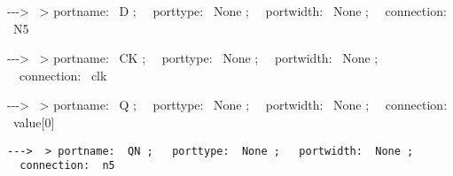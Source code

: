 \documentclass[a4paper]{article}
\begin{document}
\begin{center}
\begin{minipage}{6.07292in}
{\ttfamily\color[rgb]{0.0,0.0,0.039215688}
{}-{}-{}-{\textgreater} \ {\textgreater} portname: \ D ; \ \ porttype:
\ None ; \ \ portwidth: \ None ; \ \ connection: \ N5}

{\ttfamily\color[rgb]{0.0,0.0,0.039215688}
{}-{}-{}-{\textgreater} \ {\textgreater} portname: \ CK ; \ \ porttype:
\ None ; \ \ portwidth: \ None ; \ \ connection: \ clk}

{\ttfamily\color[rgb]{0.0,0.0,0.039215688}
{}-{}-{}-{\textgreater} \ {\textgreater} portname: \ Q ; \ \ porttype:
\ None ; \ \ portwidth: \ None ; \ \ connection: \ value[0]}

{\color[rgb]{0.0,0.0,0.039215688}
\texttt{{}-{}-{}-{\textgreater} \ {\textgreater} portname: \ QN ;
\ \ porttype: \ None ; \ \ portwidth: \ None ; \ \ connection: \ n5}}
\end{minipage}
\end{center}

\bigskip


\bigskip


\bigskip


\bigskip


\bigskip


\bigskip


\bigskip


\bigskip


\bigskip


\bigskip


\bigskip


\bigskip


\bigskip


\bigskip


\bigskip


\bigskip


\bigskip


\bigskip


\bigskip


\bigskip


\bigskip

{\centering \par}
\end{document}
